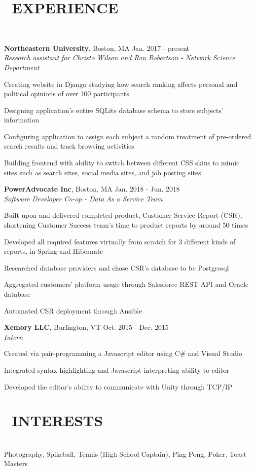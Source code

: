\documentclass[11pt]{res}
\newcommand{\sectionunderline}{\vspace{-3mm}\hrulefill\\}
\newcommand{\newsect}[1]{\section{\Large \bf #1}}
\begin{document}
\begin{resume}
  \newsect{\faUsers\ EXPERIENCE}{
    \sectionunderline{
      {\bf Northeastern University}, Boston, MA \hfill Jan. 2017 - present\\
      {\it Research assistant for Christo Wilson and Ron Robertson - Network Science Department}
      \begin{itemize}
        {\item Creating website in Django studying how search ranking affects personal and political opinions of over 100 participants}
        {\item Designing application's entire SQLite database schema to store subjects' information}
        {\item Configuring application to assign each subject a random treatment of pre-ordered search results and track browsing activities}
        {\item Building frontend with ability to switch between different CSS skins to mimic sites such as search sites, social media sites, and job posting sites}
      \end{itemize}

      {\bf PowerAdvocate Inc}, Boston, MA \hfill Jan. 2018 - Jun. 2018\\
      {\it Software Developer Co-op - Data As a Service Team}
      \begin{itemize}
        {\item Built upon and delivered completed product, Customer Service Report (CSR), shortening Customer Success team's time to product reports by around 50 times}
        {\item Developed all required features virtually from scratch for 3 different kinds of reports, in Spring and Hibernate}
        {\item Researched database providers and chose CSR's database to be Postgresql}
        {\item Aggregated customers' platform usage through Salesforce REST API and Oracle database}
        {\item Automated CSR deployment through Ansible}
      \end{itemize}

      {\bf Xemory LLC}, Burlington, VT \hfill Oct. 2015 - Dec. 2015\\
      {\it Intern}
      \begin{itemize}
        {\item Created via pair-programming a Javascript editor using C\# and Visual Studio}
        {\item Integrated syntax highlighting and Javascript interpreting ability to editor}
        {\item Developed the editor's ability to communicate with Unity through TCP/IP}
      \end{itemize}
    }
  }

  \newsect{\faCamera\ INTERESTS}{
    \sectionunderline{
      Photography, Spikeball, Tennis (High School Captain), Ping Pong, Poker, Toast Masters
    }
  }
\end{resume}
\end{document}
